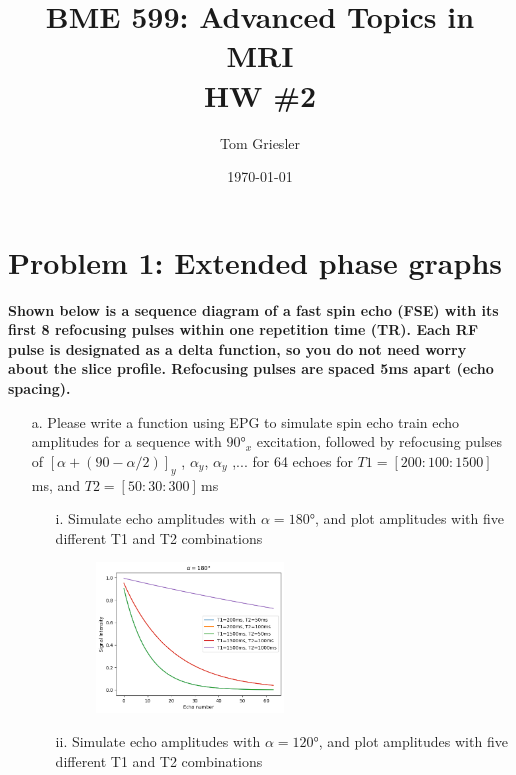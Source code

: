 \documentclass{article}
\title{BME 599: Advanced Topics in MRI\\HW \#2}
\author{Tom Griesler}
\date{\today}
\begin{document}
\maketitle

\section{Problem 1: Extended phase graphs}
\textbf{Shown below is a sequence diagram of a fast spin echo (FSE) with its first 8 refocusing pulses within one repetition time (TR). Each RF pulse is designated as a delta function, so you do not need worry about the slice profile. Refocusing pulses are spaced 5ms apart (echo spacing).}

\begin{itemize}

    \item[a.] Please write a function using EPG to simulate spin echo train echo amplitudes for a sequence with $90$°$_x$ excitation, followed by refocusing pulses of $[\alpha+(90- \alpha/2)]_y$ , $\alpha_y$, $\alpha_y$ ,... for 64 echoes for $T1 = [200:100:1500]\,$ms, and $T2 = [50:30:300]\,$ms
    
        \begin{itemize}

            \item[i.] Simulate echo amplitudes with $\alpha = 180$°, and plot amplitudes with five different T1 and T2 combinations
            
                \begin{figure}[h!]
                    \centering
                    \includegraphics[width=0.5\textwidth]{figures/1_a_i.png}
                    \caption{}
                    \label{}
                \end{figure}

            \item[ii.] Simulate echo amplitudes with $\alpha = 120$°, and plot amplitudes with five different T1 and T2 combinations
            

\end{itemize}
\end{itemize}
\end{document}
